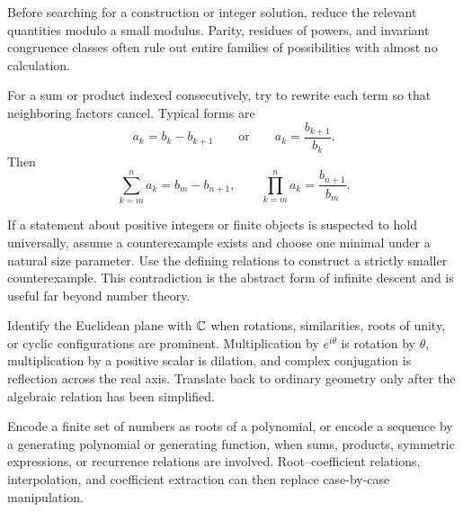     \begin{strategy}
        Before searching for a construction or integer solution, reduce the
        relevant quantities modulo a small modulus. Parity, residues of powers,
        and invariant congruence classes often rule out entire families of
        possibilities with almost no calculation.
    \end{strategy}

    \begin{strategy}
        For a sum or product indexed consecutively, try to rewrite each term so
        that neighboring factors cancel. Typical forms are
        \[
            a_k=b_k-b_{k+1}
            \qquad\text{or}\qquad
            a_k=\frac{b_{k+1}}{b_k}.
        \]
        Then
        \[
            \sum_{k=m}^{n}a_k=b_m-b_{n+1},
            \qquad
            \prod_{k=m}^{n}a_k=\frac{b_{n+1}}{b_m}.
        \]
    \end{strategy}

    \begin{strategy}
        If a statement about positive integers or finite objects is suspected to
        hold universally, assume a counterexample exists and choose one minimal
        under a natural size parameter. Use the defining relations to construct
        a strictly smaller counterexample. This contradiction is the abstract
        form of infinite descent and is useful far beyond number theory.
    \end{strategy}

    \begin{strategy}
        Identify the Euclidean plane with $\mathbb{C}$ when rotations, similarities,
        roots of unity, or cyclic configurations are prominent. Multiplication
        by $e^{i\theta}$ is rotation by $\theta$, multiplication by a positive
        scalar is dilation, and complex conjugation is reflection across the
        real axis. Translate back to ordinary geometry only after the algebraic
        relation has been simplified.
    \end{strategy}

    \begin{strategy}
        Encode a finite set of numbers as roots of a polynomial, or encode a
        sequence by a generating polynomial or generating function, when sums,
        products, symmetric expressions, or recurrence relations are involved.
        Root--coefficient relations, interpolation, and coefficient extraction
        can then replace case-by-case manipulation.
    \end{strategy}

